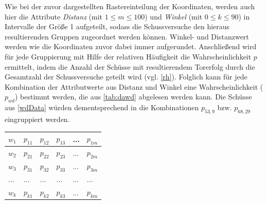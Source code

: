 Wie bei der zuvor dargestellten Rastereinteilung der Koordinaten, werden auch hier die Attribute \textit{Distanz} (mit $1 \le m \le 100$) und \textit{Winkel} (mit $0 \le k \le 90$) in Intervalle der Größe 1 aufgeteilt, sodass die Schussversuche den hieraus resultierenden Gruppen zugeordnet werden können. Winkel- und Distanzwert werden wie die Koordinaten zuvor dabei immer aufgerundet. Anschließend wird für jede Gruppierung mit Hilfe der relativen Häufigkeit die Wahrscheinlichkeit $p$ ermittelt, indem die Anzahl der Schüsse mit resultierendem Torerfolg durch die Gesamtzahl der Schussversuche geteilt wird (vgl. \vref{rh}). Folglich kann für jede Kombination der Attributwerte aus Distanz und Winkel eine Wahrscheinlichkeit ($p_{wd}$) bestimmt werden, die aus \vref{tab:dawd} abgelesen werden kann. Die Schüsse aus \vref{wdData} würden dementsprechend in die Kombinationen $p_{53,9}$ bzw. $p_{68,29}$ eingruppiert werden.


\tablelasttail{}
\begin{center}%
\begin{supertabular}{ | P{3.2cm} | P{1.5cm} | P{1.5cm} | P{1.5cm} | P{1.5cm} |  P{1.5cm} |}
\textsf{$w_1$}	&   $p_{11}$	& 	$p_{12}$  &  $p_{13}$  &  ... &  $p_{1m}$\\
\hline
\textsf{$w_2$}	&   $p_{21}$	& 	$p_{22}$  &  $p_{23}$  &  ... &  $p_{2m}$\\
\hline
\textsf{$w_3$}	&   $p_{31}$	& 	$p_{32}$  &  $p_{33}$  &  ... &  $p_{3m}$\\
\hline
\textsf{...}	&   ...	        & 	...       &  ...        &  ... & ...\\
\hline
\textsf{$w_k$}	&   $p_{k1}$	& 	$p_{k2}$  &  $p_{k3}$  &  ... &  $p_{km	}$\\
\hline
\end{supertabular}
\end{center}





